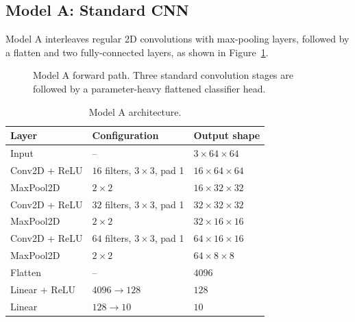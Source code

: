 \documentclass[11pt]{article}
\begin{document}
\subsection{Model A: Standard CNN}

Model A interleaves regular 2D convolutions with max-pooling layers,
followed by a flatten and two fully-connected layers, as shown in
Figure~\ref{fig:model-a-pipeline}.

\begin{figure}[H]
\centering
{}
\caption{Model A forward path. Three standard convolution stages are followed
by a parameter-heavy flattened classifier head.}
\label{fig:model-a-pipeline}
\end{figure}

\begin{table}[H]
\centering
\caption{Model A architecture.}
\label{tab:model-a-arch}
\begin{tabular}{lll}
\toprule
Layer & Configuration & Output shape \\
\midrule
Input & -- & $3 \times 64 \times 64$ \\
Conv2D + ReLU & $16$ filters, $3\times3$, pad 1 & $16 \times 64 \times 64$ \\
MaxPool2D & $2\times2$ & $16 \times 32 \times 32$ \\
Conv2D + ReLU & $32$ filters, $3\times3$, pad 1 & $32 \times 32 \times 32$ \\
MaxPool2D & $2\times2$ & $32 \times 16 \times 16$ \\
Conv2D + ReLU & $64$ filters, $3\times3$, pad 1 & $64 \times 16 \times 16$ \\
MaxPool2D & $2\times2$ & $64 \times 8 \times 8$ \\
Flatten & -- & $4096$ \\
Linear + ReLU & $4096 \rightarrow 128$ & $128$ \\
Linear & $128 \rightarrow 10$ & $10$ \\
\bottomrule
\end{tabular}
\end{table}
\end{document}
